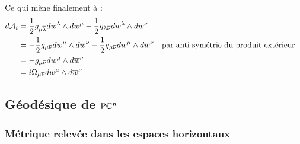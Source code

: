 \\
Ce qui mène finalement à :
\begin{align*}
	d\mathcal{A}_i &= \frac{1}{2} g_{\mu \overline{\lambda}} d\overline{w}^\lambda \wedge dw^\mu  - \frac{1}{2} g_{\lambda \overline{\nu}} dw^\lambda \wedge d\overline{w}^\nu \\
	&= -\frac{1}{2} g_{\mu \overline{\nu}} dw^\mu \wedge d\overline{w}^\nu  - \frac{1}{2} g_{\mu \overline{\nu}} dw^\mu \wedge d\overline{w}^\nu  &  &\text{par anti-symétrie du produit extérieur}\\
	&= - g_{\mu \overline{\nu}} dw^\mu \wedge d\overline{w}^\nu \\
	&= i\Omega_{\mu \overline{\nu}} dw^\mu \wedge d\overline{w}^\nu
\end{align*}
\skipl


\subsection{Géodésique de $\boldsymbol{\text{\normalfont P}\mathbb{C}^{n}}$}

\subsubsection{Métrique relevée dans les espaces horizontaux}

